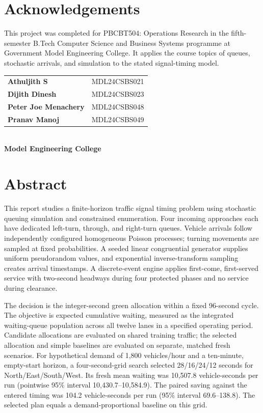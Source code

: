 \documentclass[12pt,a4paper]{report}
\begin{document}
\chapter*{Acknowledgements}
\thispagestyle{fancy}
This project was completed for PBCBT504: Operations Research in the fifth-semester B.Tech Computer Science and Business Systems programme at Government Model Engineering College. It applies the course topics of queues, stochastic arrivals, and simulation to the stated signal-timing model.

\vspace{0.5cm}
\begin{flushright}{\small\begin{tabular}{l l}
\textbf{Athuljith S} & MDL24CSBS021\\
\textbf{Dijith Dinesh} & MDL24CSBS023\\
\textbf{Peter Joe Menachery} & MDL24CSBS048\\
\textbf{Pranav Manoj} & MDL24CSBS049
\end{tabular}\\[0.2cm]\textbf{Model Engineering College}}\end{flushright}
\newpage

\chapter*{Abstract}
This report studies a finite-horizon traffic signal timing problem using stochastic queuing simulation and constrained enumeration. Four incoming approaches each have dedicated left-turn, through, and right-turn queues. Vehicle arrivals follow independently configured homogeneous Poisson processes; turning movements are sampled at fixed probabilities. A seeded linear congruential generator supplies uniform pseudorandom values, and exponential inverse-transform sampling creates arrival timestamps. A discrete-event engine applies first-come, first-served service with two-second headways during four protected phases and no service during clearance.

The decision is the integer-second green allocation within a fixed 96-second cycle. The objective is expected cumulative waiting, measured as the integrated waiting-queue population across all twelve lanes in a specified operating period. Candidate allocations are evaluated on shared training traffic; the selected allocation and simple baselines are evaluated on separate, matched fresh scenarios. For hypothetical demand of 1,800 vehicles/hour and a ten-minute, empty-start horizon, a four-second-grid search selected 28/16/24/12 seconds for North/East/South/West. Its fresh mean waiting was 10,507.8 vehicle-seconds per run (pointwise 95\% interval 10,430.7--10,584.9). The paired saving against the entered timing was 104.2 vehicle-seconds per run (95\% interval 69.6--138.8). The selected plan equals a demand-proportional baseline on this grid.
\end{document}
